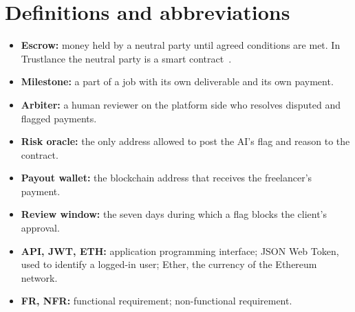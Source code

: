 \section{Definitions and abbreviations}
\begin{itemize}
\item \textbf{Escrow:} money held by a neutral party until agreed conditions are met. In Trustlance the neutral party is a smart contract~\cite{ethereum}.
\item \textbf{Milestone:} a part of a job with its own deliverable and its own payment.
\item \textbf{Arbiter:} a human reviewer on the platform side who resolves disputed and flagged payments.
\item \textbf{Risk oracle:} the only address allowed to post the AI's flag and reason to the contract.
\item \textbf{Payout wallet:} the blockchain address that receives the freelancer's payment.
\item \textbf{Review window:} the seven days during which a flag blocks the client's approval.
\item \textbf{API, JWT, ETH:} application programming interface; JSON Web Token, used to identify a logged-in user; Ether, the currency of the Ethereum network.
\item \textbf{FR, NFR:} functional requirement; non-functional requirement.
\end{itemize}

